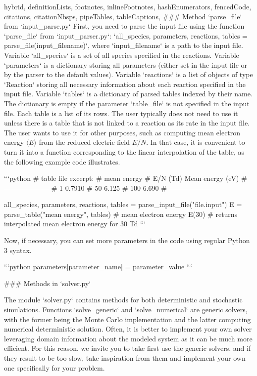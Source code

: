 \begin{markdown*}{%
  hybrid,
  definitionLists,
  footnotes,
  inlineFootnotes,
  hashEnumerators,
  fencedCode,
  citations,
  citationNbsps,
  pipeTables,
  tableCaptions,
}
### Method `parse_file` from `input_parse.py`
First, you need to parse the input file using the function `parse_file` from `input_parser.py`: `all_species, parameters, reactions, tables = parse_file(input_filename)`, where `input_filename` is a path to the input file. Variable `all_species` is a set of all species specified in the reactions. Variable `parameters` is a dictionary storing all parameters (either set in the input file or by the parser to the default values). Variable `reactions` is a list of objects of type  `Reaction` storing all necessary information about each reaction specified in the input file. Variable `tables` is a dictionary of parsed tables indexed by their name. The dictionary is empty if the parameter `table_file` is not specified in the input file. Each table is a list of its rows. The user typically does not need to use it unless there is a table that is not linked to a reaction as its rate in the input file. The user wants to use it for other purposes, such as computing mean electron energy $\langle E \rangle$ from the reduced electric field $E/N$. In that case, it is convenient to turn it into a function corresponding to the linear interpolation of the table, as the following example code illustrates.

```python
# table file excerpt:
# mean energy
# E/N (Td)    Mean energy (eV)
# --------------------
# 1	    0.7910
# 50	6.125	
# 100	6.690
# --------------------

all_species, parameters, reactions, tables = parse_input_file("file.input")
E = parse_table("mean energy", tables)  # mean electron energy
E(30)  # returns interpolated mean electron energy for 30 Td
```

Now, if necessary, you can set more parameters in the code using regular Python 3 syntax.

```python
parameters[parameter_name] = parameter_value
```

### Methods in `solver.py`

The module `solver.py` contains methods for both deterministic and stochastic simulations. Functions `solve_generic` and `solve_numerical` are generic solvers, with the former being the Monte Carlo implementation and the latter computing numerical deterministic solution. Often, it is better to implement your own solver leveraging domain information about the modeled system as it can be much more efficient. For this reason, we invite you to take first use the generic solvers, and if they result to be too slow, take inspiration from them and implement your own one specifically for your problem.



\end{markdown*}
